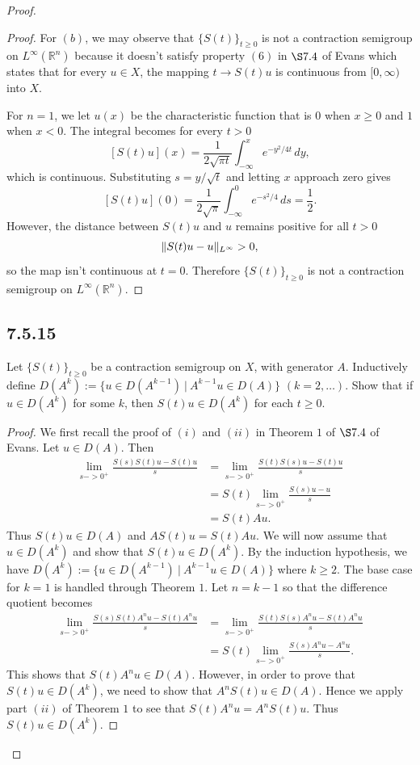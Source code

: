 \documentclass{article}
\DeclarePairedDelimiter{\norm}{\lVert}{\rVert}
\begin{document}
\begin{flushleft}
\begin{proof}
\begin{proof}
For $(b)$, we may observe that $\{S(t)\}_{t\ge 0}$ is not a contraction semigroup on $L^{\infty}(\mathbb R^n)$ because it doesn't satisfy property $(6)$ in $\S 7.4$ of Evans which states that for every $u\in X$, the mapping $t\to S(t)u$ is continuous from $[0,\infty)$ into $X$.

For $n=1$, we let $u(x)$ be the characteristic function that is $0$ when $x \ge 0$ and $1$ when $x < 0$. The integral becomes for every $t>0$
$$[S(t)u](x)=\frac{1}{2\sqrt{\pi t}}\int_{-\infty}^{x} e^{-y^2/{4t}}\,dy, $$
which is continuous. Substituting $s = y/\sqrt{t}$ and letting $x$ approach zero gives
$$[S(t)u](0)=\frac{1}{2\sqrt{\pi}}\int_{-\infty}^{0} e^{-s^2/{4}}\,ds=\frac{1}{2}. $$
However, the distance between $S(t)u$ and $u$ remains positive for all $t>0$
$$\norm{S(t)u - u}_{L^{\infty}} > 0,$$
so the map isn't continuous at $t=0$. Therefore $\{S(t)\}_{t\ge 0}$ is not a contraction semigroup on $L^{\infty}(\mathbb R^n).$
\end{proof}

\subsection{\textbf{7.5.15}} Let $\{S(t)\}_{t\ge 0}$ be a contraction semigroup on $X$, with generator $A$. Inductively define $D(A^k):=\{u\in D(A^{k-1})~|~A^{k-1}u\in D(A)\}$ $(k=2,\ldots)$. Show that if $u\in D(A^k)$ for some $k$, then $S(t)u\in D(A^k)$ for each $t\ge 0$. 
\begin{proof}
We first recall the proof of $(i)$ and $(ii)$ in Theorem $1$ of $\S 7.4$ of Evans. Let $u\in D(A)$. Then
\begin{align*}
\lim_{s->0^+}\frac{S(s)S(t)u-S(t)u}{s} &=
\lim_{s->0^+}\frac{S(t)S(s)u-S(t)u}{s} \\&=
S(t)\lim_{s->0^+}\frac{S(s)u-u}{s} \\&=
S(t)Au.
\end{align*}
Thus $S(t)u\in D(A)$ and $AS(t)u=S(t)Au$. We will now assume that $u\in D(A^k)$ and show that $S(t)u\in D(A^k)$. By the induction hypothesis, we have $D(A^k):=\{u\in D(A^{k-1})~|~A^{k-1}u\in D(A)\}$ where $k\ge 2$. The base case for $k=1$ is handled through Theorem $1$. Let $n=k-1$ so that the difference quotient becomes
\begin{align*}
\lim_{s->0^+}\frac{S(s)S(t)A^n u-S(t)A^n u}{s} &=
\lim_{s->0^+}\frac{S(t)S(s)A^n u-S(t)A^n u}{s} \\&=
S(t)\lim_{s->0^+}\frac{S(s)A^n u-A^n u}{s}.
\end{align*}
This shows that $S(t)A^n u \in D(A)$. However, in order to prove that $S(t)u\in D(A^k)$, we need to show that $A^nS(t)u\in D(A) $. Hence we apply part $(ii)$ of Theorem $1$ to see that $S(t)A^n u = A^n S(t)u$. Thus $S(t)u\in D(A^k)$. 
\end{proof}

\end{proof}
\end{flushleft}
\end{document}
